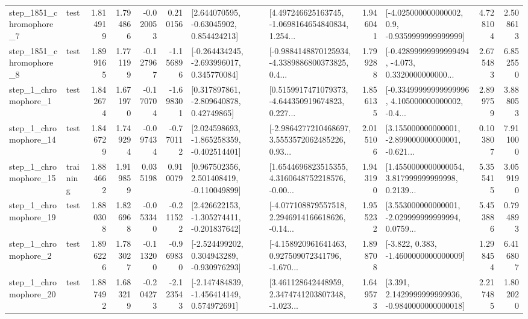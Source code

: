 \begin{tabular}{llrrrrllrlrr}
  step\_1851\_chromophore\_7 &      test &      1.814919 &    1.794866 &     -0.020053 &  0.210156 &     [2.644070595, -0.63045902, 0.854424213] &  [4.497246625163745, -1.0698164654840834, 1.254... &       1.946041 &     [-4.025000000000002, 0.9, -0.9359999999999999] &            4.728104 &          2.508613 \\
  step\_1851\_chromophore\_8 &      test &      1.899165 &    1.771199 &     -0.127967 & -1.156896 &   [-0.264434245, -2.693996017, 0.345770084] &  [-0.9884148870125934, -4.3389886800373825, 0.4... &       1.799288 &  [-0.42899999999999494, -4.073, 0.3320000000000... &            2.675483 &          6.852550 \\
     step\_1\_chromophore\_1 &      test &      1.842674 &    1.671970 &     -0.170704 & -1.698301 &     [0.317897861, -2.809640878, 0.42749865] &  [0.5159917471079373, -4.644350919674823, 0.227... &       1.856135 &  [-0.33499999999999996, 4.105000000000002, -0.4... &            2.899759 &          3.888053 \\
    step\_1\_chromophore\_14 &      test &      1.846729 &    1.749294 &     -0.097434 & -0.770112 &   [2.024598693, -1.865258359, -0.402514401] &  [-2.9864277210468697, 3.5553572062485226, 0.93... &       2.015106 &  [3.155000000000001, -2.899000000000001, -0.621... &            0.103807 &          7.911000 \\
    step\_1\_chromophore\_15 &  training &      1.884662 &    1.919859 &      0.035198 &  0.910079 &    [0.967502356, 2.501408419, -0.110049899] &  [1.6544696823515355, 4.3160648752218576, -0.00... &       1.943190 &  [1.4550000000000054, 3.817999999999998, 0.2139... &            5.355415 &          3.059190 \\
    step\_1\_chromophore\_19 &      test &      1.880308 &    1.826968 &     -0.053340 & -0.211522 &   [2.426622153, -1.305274411, -0.201837642] &  [-4.077108879557518, 2.2946914166618626, -0.14... &       1.955232 &  [3.553000000000001, -2.029999999999994, 0.0759... &            5.453886 &          0.794893 \\
     step\_1\_chromophore\_2 &      test &      1.896226 &    1.783027 &     -0.113200 & -0.969830 &   [-2.524499202, 0.304943289, -0.930976293] &  [-4.158920961641463, 0.927509072341796, -1.670... &       1.898708 &               [-3.822, 0.383, -1.4600000000000009] &            1.298454 &          6.416807 \\
    step\_1\_chromophore\_20 &      test &      1.887492 &    1.683219 &     -0.204273 & -2.123543 &   [-2.147484839, -1.456414149, 0.574972691] &  [3.461128642448959, 2.3474741203807348, -1.023... &       1.649573 &   [3.391, 2.1429999999999936, -0.9840000000000018] &            2.217485 &          1.802020 \\

\end{tabular}
